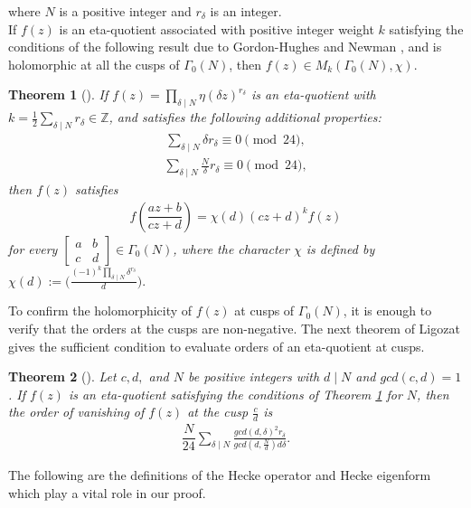 \documentclass[11pt,a4paper]{article}
\numberwithin{equation}{section}
\theoremstyle{plain}
\newtheorem{theorem}{Theorem}[section]
\begin{document}
where $N$ is a positive integer and $r_{\delta}$ is an integer.\\ 
\indent If $f(z)$ is an eta-quotient associated with positive integer weight $k$ satisfying the conditions of the following result due to Gordon-Hughes \cite{gordon} and  Newman \cite{newmf}, and is holomorphic at all the cusps of $\Gamma_0(N)$, then $f(z) \in M_k(\Gamma_0(N), \chi )$. 
\begin{theorem}[{{\cite[Theorem~1.64]{wom}}}]\label{t2.1}
	If $ f(z)= \prod_{\delta \mid N} \eta(\delta z)^{r_\delta}$ is an eta-quotient with
	$k= \frac{1}{2} \sum_{\delta \mid N}{r_\delta} \in \mathbb{Z}$, and satisfies the following additional properties:
	\begin{align}\label{2.3}
		\sum_{\delta\mid N} \delta {r_\delta} \equiv 0 \pmod {24},
	\end{align}
	\begin{align}\label{2.4}
		\sum_{\delta \mid N} \frac{N}{\delta}  {r_\delta} \equiv 0 \pmod {24},
	\end{align}
	then $f(z)$ satisfies 
	\begin{align*}
		f\left(\dfrac{az+b}{cz+d}\right)=\chi(d)(cz+d)^kf(z)
	\end{align*} 
	for every $\begin{bmatrix}
		a & b \\
		c & d
	\end{bmatrix}\in \Gamma_0(N)$, where the character $\chi$
	is defined by
	$\chi (d) := \bigg( \frac{(-1)^k \prod_{\delta \mid N} \delta^{r_\delta}}{d} \bigg).$
\end{theorem}
To confirm the holomorphicity of $f(z)$ at cusps of $\Gamma_0(N)$, it is enough to verify that the orders at the cusps are non-negative. The next theorem of Ligozat \cite{ligozat} gives the sufficient condition to evaluate orders of an eta-quotient at cusps.
\begin{theorem}[{{\cite[Theorem~1.65]{wom}}}]\label{t2.2}
	Let $c,d,$ and $N$ be positive integers with $d\mid N$ and $gcd(c,d)=1$. If $f(z)$ is an eta-quotient satisfying the conditions of Theorem \ref{t2.1} for $N$, then the order of vanishing of $f(z)$ at the cusp $\frac{c}{d}$ is 
	\begin{align*}
		\dfrac{N}{24}\sum_{\delta\mid N} \frac{gcd(d,\delta)^2 r_\delta}{ gcd(d,\frac{N}{d})d\delta}.		
	\end{align*}
\end{theorem}
The following are the definitions of the Hecke operator and Hecke eigenform which play a vital role in our proof.
\end{document}
